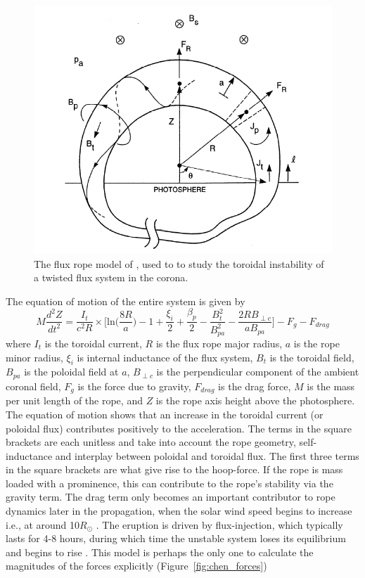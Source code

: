 \begin{figure}[!t]
\begin{center}
\includegraphics[scale=0.4, trim=0cm 1cm 0cm 1cm]{images/chen_model}
\caption[The toroidal instability CME model]{The flux rope model of \citet{chen1989}, used to to study the toroidal instability of a twisted flux system in the corona.}
\label{fig:chen_model}
\end{center}
\end{figure}
The equation of motion of the entire system is given by
\begin{equation}
M\frac{d^2Z}{dt^2} = \frac{I_t}{c^2R}\times\bigg[ \mathrm{ln}\bigg(\frac{8R}{a}\bigg) -1+ \frac{\xi_i}{2} + \frac{\beta_p}{2} -\frac{B^2_t}{B^2_{pa}}  -\frac{2RB_{\perp c}}{aB_{pa}} \bigg] - F_g - F_{drag}
\end{equation}
where $I_t$ is the toroidal current, $R$ is the flux rope major radius, $a$ is the rope minor radius, $\xi_i$ is internal inductance of the flux system, $B_t$ is the toroidal field, $B_{pa}$ is the poloidal field at $a$, $B_{\perp c}$ is the perpendicular component of the ambient coronal field, $F_g$ is the force due to gravity, $F_{drag}$ is the drag force, $M$ is the mass per unit length of the rope, and $Z$ is the rope axis height above the photosphere. The equation of motion shows that an increase in the toroidal current (or poloidal flux) contributes positively to the acceleration. The terms in the square brackets are each unitless and take into account the rope geometry, self-inductance and interplay between poloidal and toroidal flux. The first three terms in the square brackets are what give rise to the hoop-force. If the rope is mass loaded with a prominence, this can contribute to the rope's stability via the gravity term. The drag term only becomes an important contributor to rope dynamics later in the propagation, when the solar wind speed begins to increase i.e., at around 10$R_{\odot}$ \citep{sheeley1997}. The eruption is driven by flux-injection, which typically lasts for 4-8 hours, during which time the unstable system loses its equilibrium and begins to rise \citet{krall2001}. This model is perhaps the only one to calculate the magnitudes of the forces explicitly (Figure~\ref{fig:chen_forces})
